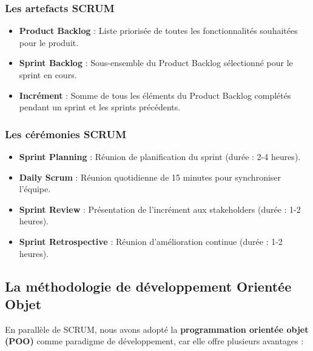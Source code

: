 \documentclass[12pt,a4paper]{report}
\begin{document}
\subsubsection{Les artefacts SCRUM}

\begin{itemize}[leftmargin=1cm]
    \item \textbf{Product Backlog} : Liste priorisée de toutes les fonctionnalités souhaitées pour le produit.
    
    \item \textbf{Sprint Backlog} : Sous-ensemble du Product Backlog sélectionné pour le sprint en cours.
    
    \item \textbf{Incrément} : Somme de tous les éléments du Product Backlog complétés pendant un sprint et les sprints précédents.
\end{itemize}

\subsubsection{Les cérémonies SCRUM}

\begin{itemize}[leftmargin=1cm]
    \item \textbf{Sprint Planning} : Réunion de planification du sprint (durée : 2-4 heures).
    
    \item \textbf{Daily Scrum} : Réunion quotidienne de 15 minutes pour synchroniser l'équipe.
    
    \item \textbf{Sprint Review} : Présentation de l'incrément aux stakeholders (durée : 1-2 heures).
    
    \item \textbf{Sprint Retrospective} : Réunion d'amélioration continue (durée : 1-2 heures).
\end{itemize}

\subsection{La méthodologie de développement Orientée Objet}

En parallèle de SCRUM, nous avons adopté la \textbf{programmation orientée objet (POO)} comme paradigme de développement, car elle offre plusieurs avantages :
\end{document}
